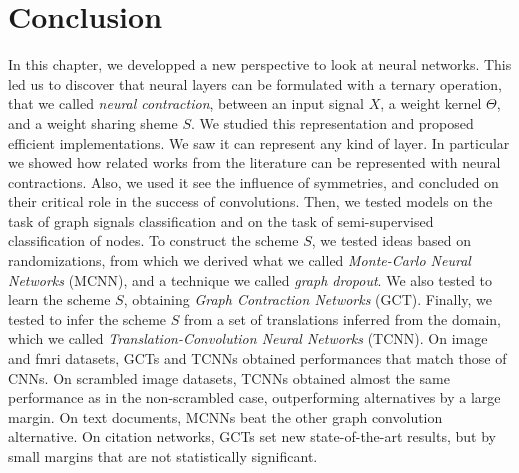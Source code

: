 \section{Conclusion}
\label{sec:3.5}

In this chapter, we developped a new perspective to look at neural networks. This led us to discover that neural layers can be formulated with a ternary operation, that we called \emph{neural contraction}, between an input signal $X$, a weight kernel $\Theta$, and a weight sharing sheme $S$. We studied this representation and proposed efficient implementations. We saw it can represent any kind of layer. In particular we showed how related works from the literature can be represented with neural contractions. Also, we used it see the influence of symmetries, and concluded on their critical role in the success of convolutions. Then, we tested models on the task of graph signals classification and on the task of semi-supervised classification of nodes. To construct the scheme $S$, we tested ideas based on randomizations, from which we derived what we called \emph{Monte-Carlo Neural Networks} (MCNN), and a technique we called \emph{graph dropout}. We also tested to learn the scheme $S$, obtaining \emph{Graph Contraction Networks} (GCT). Finally, we tested to infer the scheme $S$ from a set of translations inferred from the domain, which we called \emph{Translation-Convolution Neural Networks} (TCNN). On image and fmri datasets, GCTs and TCNNs obtained performances that match those of CNNs. On scrambled image datasets, TCNNs obtained almost the same performance as in the non-scrambled case, outperforming alternatives by a large margin. On text documents, MCNNs beat the other graph convolution alternative. On citation networks, GCTs set new state-of-the-art results, but by small margins that are not statistically significant.